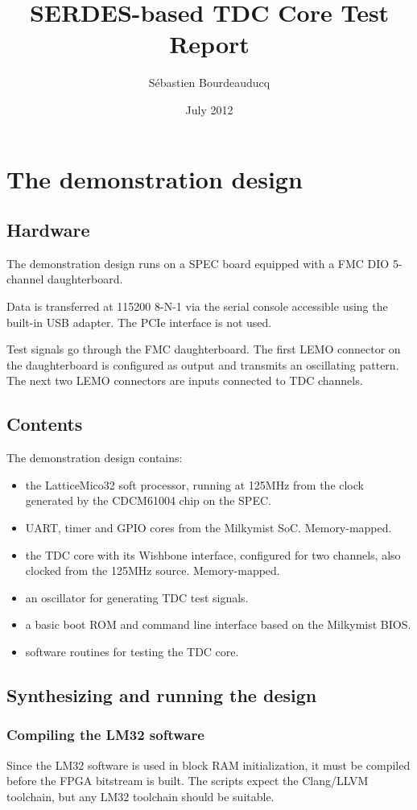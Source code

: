 \documentclass[a4paper,11pt]{article}
\title{SERDES-based TDC Core Test Report}
\author{S\'ebastien Bourdeauducq}
\date{July 2012}
\begin{document}
\setlength{\parindent}{0pt}
\setlength{\parskip}{5pt}
\maketitle{}
\section{The demonstration design}
\subsection{Hardware}
The demonstration design runs on a SPEC board equipped with a FMC DIO 5-channel daughterboard.

Data is transferred at 115200 8-N-1 via the serial console accessible using the built-in USB adapter. The PCIe interface is not used.

Test signals go through the FMC daughterboard. The first LEMO connector on the daughterboard is configured as output and transmits an oscillating pattern. The next two LEMO connectors are inputs connected to TDC channels.

\subsection{Contents}
The demonstration design contains:
\begin{itemize}
\item the LatticeMico32 soft processor, running at 125MHz from the clock generated by the CDCM61004 chip on the SPEC.
\item UART, timer and GPIO cores from the Milkymist SoC. Memory-mapped.
\item the TDC core with its Wishbone interface, configured for two channels, also clocked from the 125MHz source. Memory-mapped.
\item an oscillator for generating TDC test signals.
\item a basic boot ROM and command line interface based on the Milkymist BIOS.
\item software routines for testing the TDC core.
\end{itemize}

\subsection{Synthesizing and running the design}
\subsubsection{Compiling the LM32 software}
Since the LM32 software is used in block RAM initialization, it must be compiled before the FPGA bitstream is built. The scripts expect the Clang/LLVM toolchain, but any LM32 toolchain should be suitable.
\end{document}
